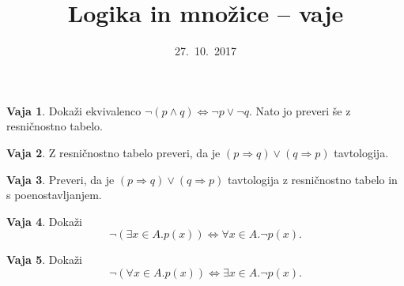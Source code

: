 \documentclass{article}
\newcommand{\lthen}{\Rightarrow}
\theoremstyle{definition}
\newtheorem{vaja}{Vaja}
\begin{document}
\title{Logika in množice -- vaje}
\date{27.~10.~2017}
\maketitle

\begin{vaja}
  Dokaži ekvivalenco $\lnot (p \land q) \iff \lnot p \lor \lnot q$.
  Nato jo preveri še z resničnostno tabelo.
\end{vaja}

\begin{vaja}
  Z resničnostno tabelo preveri, da je $(p \lthen q) \lor (q \lthen p)$ tavtologija.
\end{vaja}

\begin{vaja}
  Preveri, da je $(p \lthen q) \lor (q \lthen p)$ tavtologija z resničnostno tabelo in s
  poenostavljanjem.
\end{vaja}

\begin{vaja}
  Dokaži
  \[
    \lnot (\exists x \in A . p(x))
    \iff
    \forall x \in A . \lnot p(x).
  \]
\end{vaja}

\begin{vaja}
  Dokaži
  \[
    \lnot (\forall x \in A . p(x))
    \iff
    \exists x \in A . \lnot p(x).
  \]  
\end{vaja}
\end{document}
